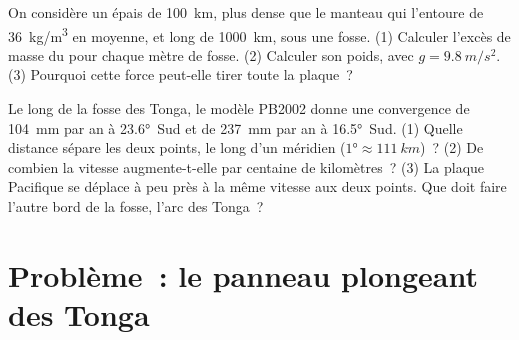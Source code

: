\begin{exercise}[$\star\star\star$]\label{exo:g11:subduction-zones:14}
On considère un  épais de \qty{100}{km}, plus dense que le
manteau qui l'entoure de \qty{36}{kg/m^3} en moyenne, et long de
\qty{1000}{km}, sous une fosse. (1) Calculer l'excès de masse du 
pour chaque mètre de fosse. (2) Calculer son poids, avec
$g = \qty{9.8}{m/s^2}$. (3) Pourquoi cette force peut-elle tirer toute la
plaque~?
\end{exercise}

\begin{exercise}[$\star\star\star$]\label{exo:g11:subduction-zones:15}
Le long de la fosse des Tonga, le modèle PB2002 donne une convergence de
\qty{104}{mm} par an à \ang{23.6}~Sud et de \qty{237}{mm} par an à
\ang{16.5}~Sud. (1) Quelle distance sépare les deux points, le long d'un
méridien ($\ang{1} \approx \qty{111}{km}$)~? (2) De combien la vitesse
augmente-t-elle par centaine de kilomètres~? (3) La plaque Pacifique se
déplace à peu près à la même vitesse aux deux points. Que doit faire
l'autre bord de la fosse, l'arc des Tonga~?
\end{exercise}

\section{Problème~: le panneau plongeant des Tonga}

